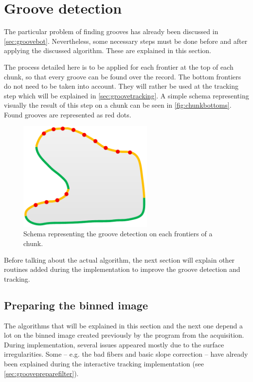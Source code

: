 \section{Groove detection}
\label{sec:groovedetect}

The particular problem of finding grooves has already been discussed in \autoref{sec:groovebot}. Nevertheless, some necessary steps must be done before and after applying the discussed algorithm. These are explained in this section.

The process detailed here is to be applied for each frontier at the top of each chunk, so that every groove can be found over the record. The bottom frontiers do not need to be taken into account. They will rather be used at the tracking step which will be explained in \autoref{sec:groovetracking}. A simple schema representing visually the result of this step on a chunk can be seen in \autoref{fig:chunkbottoms}. Found grooves are represented as red dots.

\begin{figure}[!ht]
\centering
\includegraphics[width=0.6\textwidth]{images/chunk-bottoms}
\caption{Schema representing the groove detection on each frontiers of a chunk.}
\label{fig:chunkbottoms}
\end{figure}

Before talking about the actual algorithm, the next section will explain other routines added during the implementation to improve the groove detection and tracking.

\subsection{Preparing the binned image}

The algorithms that will be explained in this section and the next one depend a lot on the binned image created previously by the program from the acquisition. During implementation, several issues appeared mostly due to the surface irregularities. Some -- e.g. the bad fibers and basic slope correction -- have already been explained during the interactive tracking implementation (see \autoref{sec:groovepreparefilter}).

